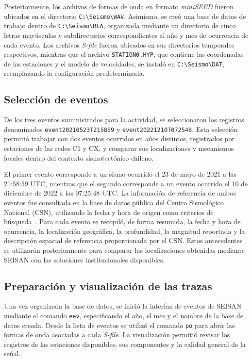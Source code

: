 \documentclass[a4paper,12pt]{article} %
\numberwithin{equation}{section} %
\numberwithin{figure}{section} %
\begin{document}
Posteriormente, los archivos de formas de onda en formato \textit{miniSEED} fueron ubicados en el directorio \texttt{C:\textbackslash Seismo\textbackslash WAV}. Asimismo, se creó una base de datos de trabajo dentro de \texttt{C:\textbackslash Seismo\textbackslash REA}, organizada mediante un directorio de cinco letras mayúsculas y subdirectorios correspondientes al año y mes de ocurrencia de cada evento. Los archivos \textit{S-file} fueron ubicados en sus directorios temporales respectivos, mientras que el archivo \texttt{STATION0.HYP}, que contiene las coordenadas de las estaciones y el modelo de velocidades, se instaló en \texttt{C:\textbackslash Seismo\textbackslash DAT}, reemplazando la configuración predeterminada.

\subsection{Selección de eventos}

De los tres eventos suministrados para la actividad, se seleccionaron los registros denominados \texttt{event20210523T215859} y \texttt{event20221210T072548}. Esta selección permitió trabajar con dos eventos ocurridos en años distintos, registrados por estaciones de las redes C1 y CX, y comparar sus localizaciones y mecanismos focales dentro del contexto sismotectónico chileno.

El primer evento corresponde a un sismo ocurrido el 23 de mayo de 2021 a las 21:58:59 UTC, mientras que el segundo corresponde a un evento ocurrido el 10 de diciembre de 2022 a las 07:25:48 UTC. La información de referencia de ambos eventos fue consultada en la base de datos pública del Centro Sismológico Nacional (CSN), utilizando la fecha y hora de origen como criterios de búsqueda~\cite{csn_event_database}. Para cada evento se recopiló, de forma resumida, la fecha y hora de ocurrencia, la localización geográfica, la profundidad, la magnitud reportada y la descripción espacial de referencia proporcionada por el CSN. Estos antecedentes se utilizarán posteriormente para comparar las localizaciones obtenidas mediante SEISAN con las soluciones institucionales disponibles.

\subsection{Preparación y visualización de las trazas}

Una vez organizada la base de datos, se inició la interfaz de eventos de SEISAN mediante el comando \texttt{eev}, especificando el año, el mes y el nombre de la base de datos creada. Desde la lista de eventos se utilizó el comando \texttt{po} para abrir las formas de onda asociadas a cada \textit{S-file}. La visualización permitió revisar los registros de las estaciones disponibles, sus componentes y la calidad general de la señal.
\end{document}
